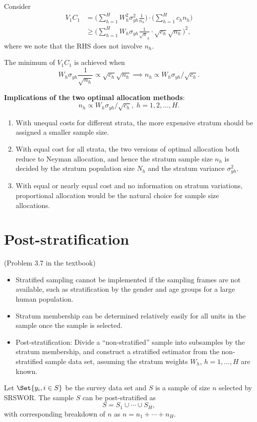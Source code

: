 Consider
\begin{align*}
      V_1 C_1 & =\biggl(\sum_{h=1}^{H}W_h^2 \sigma_{yh}^2 \frac{1}{n_h}\biggr)\cdot \biggl(\sum_{h=1}^{H}c_h n_h\biggr) \\
              & \ge \biggl(\sum_{h=1}^{H}W_h \sigma_{yh}\frac{1}{\sqrt{n}_h}\cdot \sqrt{c_h}\sqrt{n_h}\biggr)^{\!2},
\end{align*}
where we note that the RHS does not involve $ n_h $.

The minimum of $ V_1 C_1 $ is achieved when
\[ W_h \sigma_{yh}\frac{1}{\sqrt{n_h}}\propto \sqrt{c_h}\sqrt{n_h}
      \implies n_h\propto W_h\sigma_{yh}/\sqrt{c_h}. \]

\textbf{Implications of the two optimal allocation methods}:
\[ n_h\propto W_h\sigma_{yh}/\sqrt{c_h},\; h=1,2,\ldots,H. \]
\begin{enumerate}
      \item With unequal costs for different strata, the more expensive
            stratum should be assigned a smaller sample size.
      \item With equal cost for all strata, the two versions of optimal
            allocation both reduce to Neyman allocation, and hence the
            stratum sample size $ n_h $ is decided by the stratum population size
            $ N_h $ and the stratum variance $ \sigma_{yh}^2 $.
      \item With equal or nearly equal cost and no information on stratum
            variations, proportional allocation would be the natural choice
            for sample size allocations.
\end{enumerate}

\section{Post-stratification}
 (Problem 3.7 in the textbook)
\begin{itemize}
      \item Stratified sampling cannot be implemented if the sampling
            frames are not available, such as stratification by the gender and
            age groups for a large human population.
      \item Stratum membership can be determined relatively easily for all
            units in the sample once the sample is selected.
      \item Post-stratification: Divide a ``non-stratified'' sample into
            subsamples by the stratum membership, and construct a stratified
            estimator from the non-stratified sample data set, assuming the
            stratum weights $ W_h $, $ h=1,\ldots,H $ are known.
\end{itemize}
Let $ \Set{y_i,i\in S} $ be the survey data set and $ S $ is a sample of size $ n $
selected by SRSWOR\@. The sample $ S $ can be post-stratified as
\[ S=S_1\cup \cdots \cup S_H, \]
with corresponding breakdown of $ n $ as $ n=n_1+\cdots+n_H $.

